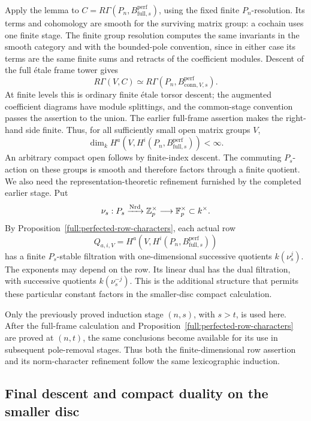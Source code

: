 Apply the lemma to
$C=R\Gamma(P_n,B_{\mathrm{full},s}^{\mathrm{perf}})$, using the
fixed finite $P_n$-resolution.  Its terms and cohomology are smooth
for the surviving matrix group: a cochain uses one finite stage.
The finite group resolution computes the same invariants in the
smooth category and with the bounded-pole convention, since in
either case its terms are the same finite sums and retracts of
the coefficient modules.
Descent of the full \'etale frame tower gives
\[
 R\Gamma(V,C)
    \simeq R\Gamma(P_n,B_{\mathrm{conn},V,s}^{\mathrm{perf}}).
\]
At finite levels this is ordinary finite \'etale torsor descent;
the augmented coefficient diagrams have module splittings, and
the common-stage convention passes the assertion to the union.
The earlier full-frame assertion makes the right-hand side finite.
Thus, for all sufficiently small open matrix groups $V$,
\begin{equation}
 \label{eq:boundary-row-finiteness}
 \dim_k H^a\!\left(V,
       H^i(P_n,B_{\mathrm{full},s}^{\mathrm{perf}})\right)<\infty.
\end{equation}
An arbitrary compact open follows by finite-index descent.  The
commuting $P_s$-action on these groups is smooth and therefore
factors through a finite quotient.  We also need the
representation-theoretic refinement furnished by the completed
earlier stage.  Put
\[
 \nu_s:P_s\xrightarrow{\operatorname{Nrd}}\mathbb Z_p^\times
             \longrightarrow\mathbb F_p^\times\subset k^\times .
\]
By Proposition~\ref{full:perfected-row-characters}, each actual
row
\begin{equation}
 \label{eq:boundary-norm-row}
 Q_{a,i,V}
   =H^a\!\left(V,H^i(P_n,B_{\mathrm{full},s}^{\mathrm{perf}})\right)
\end{equation}
has a finite $P_s$-stable filtration with one-dimensional
successive quotients $k(\nu_s^j)$.  The exponents may depend on
the row.  Its linear dual has the dual filtration, with
successive quotients $k(\nu_s^{-j})$.  This is the additional
structure that permits these particular constant factors in
the smaller-disc compact calculation.

Only the previously proved induction stage $(n,s)$, with $s>t$,
is used here.
After the full-frame calculation and
Proposition~\ref{full:perfected-row-characters} are proved at
$(n,t)$, the same conclusions become available for its use in
subsequent pole-removal stages.  Thus both the finite-dimensional
row assertion and its norm-character refinement follow the
same lexicographic induction.

\subsection{Final descent and compact duality on the smaller disc}

